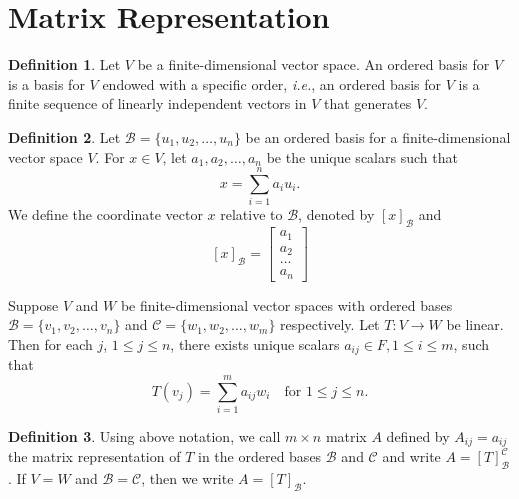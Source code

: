 \documentclass[12pt, a4paper]{article}
\theoremstyle{definition}
\newtheorem{definition}{Definition}[section]
\theoremstyle{remark}
\newcommand{\B}{\mathscr{B}}
\newcommand{\C}{\mathscr{C}}
\begin{document}
\section{Matrix Representation}
\begin{definition}
    Let $V$ be a finite-dimensional vector space. An ordered basis for $V$ is a basis for $V$ endowed with a specific order, \textit{i.e.}, an ordered basis for $V$ is a finite sequence of linearly independent vectors in $V$ that generates $V$.
\end{definition}

\begin{definition}
    Let $\B = \{u_1, u_2, \ldots, u_n\}$ be an ordered basis for a finite-dimensional vector space $V$. For $x \in V$, let $a_1, a_2, \ldots, a_n$ be the unique scalars such that \[x = \sum_{i=1}^{n}a_iu_i.\] We define the coordinate vector $x$ relative to $\B$, denoted by $[x]_\B$ and
    \[
    [x]_\B = \left[\begin{matrix}
        a_1 \\ a_2 \\ \ldots \\ a_n
    \end{matrix}\right]
    \]
\end{definition}

Suppose $V$ and $W$ be finite-dimensional vector spaces with ordered bases $\B = \{v_1, v_2, \ldots, v_n\}$ and $\C = \{w_1, w_2, \ldots, w_m\}$ respectively. Let $T:V \to W$ be linear. Then for each $j$, $1 \leq j \leq n$, there exists unique scalars $a_{ij} \in F, 1 \le i \le m$, such that
\[
T(v_j) = \sum_{i=1}^{m} a_{ij}w_i \quad \text{for } 1 \le j \le n.
\]

\begin{definition}
    Using above notation, we call $m \times n$ matrix $A$ defined by $A_{ij} = a_{ij}$ the matrix representation of $T$ in the ordered bases $\B$ and $\C$ and write $A = [T]_\B^\C$. If $V=W$ and $\B=\C$, then we write $A=[T]_\B$.
\end{definition}
\end{document}
